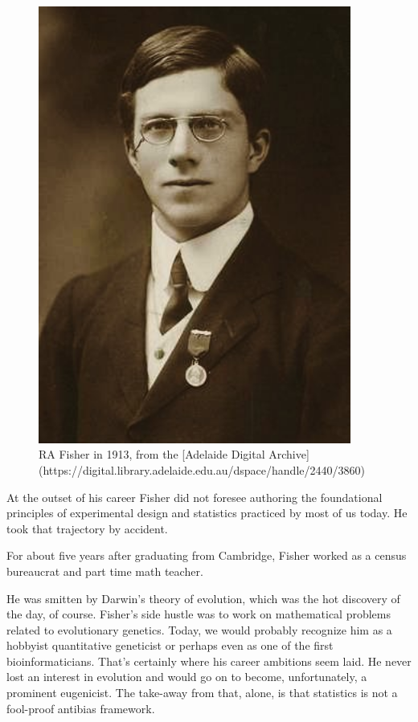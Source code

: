 \documentclass[]{book}
\begin{document}
\begin{figure}
\includegraphics[width=4.04in]{images/ra_fisher} \caption{RA Fisher in 1913, from the [Adelaide Digital Archive](https://digital.library.adelaide.edu.au/dspace/handle/2440/3860)}\label{fig:unnamed-chunk-4}
\end{figure}

At the outset of his career Fisher did not foresee authoring the foundational principles of experimental design and statistics practiced by most of us today. He took that trajectory by accident.

For about five years after graduating from Cambridge, Fisher worked as a census bureaucrat and part time math teacher.

He was smitten by Darwin's theory of evolution, which was the hot discovery of the day, of course. Fisher's side hustle was to work on mathematical problems related to evolutionary genetics. Today, we would probably recognize him as a hobbyist quantitative geneticist or perhaps even as one of the first bioinformaticians. That's certainly where his career ambitions seem laid. He never lost an interest in evolution and would go on to become, unfortunately, a prominent eugenicist. The take-away from that, alone, is that statistics is not a fool-proof antibias framework.
\end{document}
